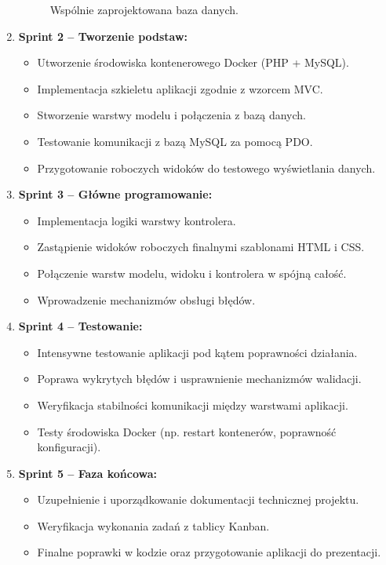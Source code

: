 \documentclass[12pt,a4paper]{article}
\begin{document}
\begin{enumerate}
\begin{figure}[h!]
		\caption{Wspólnie zaprojektowana baza danych.}
		\label{fig:bazadanych}
	\end{figure}
	\item \textbf{Sprint 2 -- Tworzenie podstaw:}
	\begin{itemize}
		\item Utworzenie środowiska kontenerowego Docker (PHP + MySQL).
		\item Implementacja szkieletu aplikacji zgodnie z wzorcem MVC.
		\item Stworzenie warstwy modelu i połączenia z bazą danych.
		\item Testowanie komunikacji z bazą MySQL za pomocą PDO.
		\item Przygotowanie roboczych widoków do testowego wyświetlania danych.
	\end{itemize}
	\item \textbf{Sprint 3 -- Główne programowanie:}
	\begin{itemize}
		\item Implementacja logiki warstwy kontrolera.
		\item Zastąpienie widoków roboczych finalnymi szablonami HTML i CSS.
		\item Połączenie warstw modelu, widoku i kontrolera w spójną całość.
		\item Wprowadzenie mechanizmów obsługi błędów.
	\end{itemize}
	\newpage
	\item \textbf{Sprint 4 -- Testowanie:}
	\begin{itemize}
		\item Intensywne testowanie aplikacji pod kątem poprawności działania.
		\item Poprawa wykrytych błędów i usprawnienie mechanizmów walidacji.
		\item Weryfikacja stabilności komunikacji między warstwami aplikacji.
		\item Testy środowiska Docker (np. restart kontenerów, poprawność konfiguracji).
	\end{itemize}
	\item \textbf{Sprint 5 -- Faza końcowa:}
	\begin{itemize}
		\item Uzupełnienie i uporządkowanie dokumentacji technicznej projektu.
		\item Weryfikacja wykonania zadań z tablicy Kanban.
		\item Finalne poprawki w kodzie oraz przygotowanie aplikacji do prezentacji.
	\end{itemize}
\end{enumerate}
	
\end{document}
